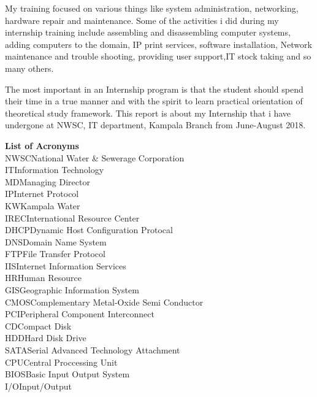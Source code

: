 \documentclass{article}
\begin{document}
\par My training focused on various things like system administration, networking, hardware repair and maintenance. Some of the activities i did during my internship training include assembling and disassembling computer systems, adding computers to the domain, IP print services, software installation, Network maintenance and trouble shooting, providing user support,IT stock taking  and so many others.
\par The most important in an Internship program is that the student should spend their time in a true manner and with the spirit to learn practical orientation of theoretical study framework. This report is about my Internship that i have undergone at NWSC, IT department, Kampala Branch from June-August 2018.
\thispagestyle{empty}
\newpage
\thispagestyle{empty}
\tableofcontents
\thispagestyle{empty}
\cleardoublepage
\thispagestyle{empty}
\newpage
\listoffigures
\newpage
\listoftables
\thispagestyle{empty}
\newpage
\textbf{List of Acronyms}\\
NWSC\dotfill  National Water \& Sewerage Corporation\\
IT\dotfill Information Technology\\
MD\dotfill Managing Director\\
IP\dotfill Internet Protocol\\
KW\dotfill Kampala Water\\
IREC\dotfill International Resource Center\\
DHCP\dotfill Dynamic Host Configuration Protocal\\
DNS\dotfill Domain Name System\\
FTP\dotfill File Transfer Protocol\\
IIS\dotfill Internet Information Services\\
HR\dotfill Human Resource\\
GIS\dotfill Geographic Information System\\
CMOS\dotfill Complementary Metal-Oxide Semi Conductor\\
PCI\dotfill Peripheral Component Interconnect\\
CD\dotfill Compact Disk\\
HDD\dotfill Hard Disk Drive\\
SATA\dotfill Serial Advanced Technology Attachment\\
CPU\dotfill Central Proccessing Unit\\
BIOS\dotfill Basic Input Output System\\
I/O\dotfill Input/Output\\
\end{document}

